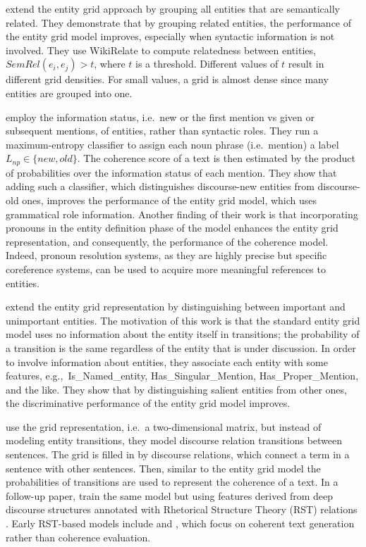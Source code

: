  extend the entity grid approach by grouping all entities that are semantically related.  
They demonstrate that by grouping related entities, the performance of the entity grid model improves, especially when syntactic information is not involved. 
They use WikiRelate \cite{strube.aaai06} to compute relatedness between entities, $SemRel(e_i,e_j) >t$, where $t$ is a threshold.
Different values of $t$ result in different grid densities. 
For small values, a grid is almost dense since many entities are grouped into one.  

 employ the information status, i.e.\ new or the first mention vs given or subsequent mentions, of entities, rather than syntactic roles. 
They run a maximum-entropy classifier to assign each noun phrase (i.e.\ mention) a label $L_{np} \in \lbrace new, old \rbrace$. 
The coherence score of a text is then estimated by the product of probabilities over the information status of each mention. 
They show that adding such a classifier, which distinguishes discourse-new entities from discourse-old ones, improves the performance of the entity grid model, which uses grammatical role information.  
Another finding of their work is that incorporating pronouns in the entity definition phase of the model enhances the entity grid representation, and consequently, the performance of the coherence model. 
Indeed, pronoun resolution systems, as they are highly precise but specific coreference systems, can be used to acquire more meaningful references to entities. 

 extend the entity grid representation by distinguishing between important and unimportant entities. 
The motivation of this work is that the standard entity grid model uses no information about the entity itself in transitions; the probability of a transition is the same regardless of the entity that is under discussion. 
In order to involve information about entities, they associate each entity with some features, e.g.,\ Is\_Named\_entity, Has\_Singular\_Mention, Has\_Proper\_Mention, and the like. 
They show that by distinguishing salient entities from other ones, the discriminative performance of the entity grid model improves. 

 use the grid representation, i.e.\ a two-dimensional matrix, but instead of modeling entity transitions, they model discourse relation transitions between sentences. 
The grid is filled in by discourse relations, which connect a term in a sentence with other sentences. 
Then, similar to the entity grid model the probabilities of transitions are used to represent the coherence of a text. 
In a follow-up paper,  train the same model but using features derived from deep discourse structures annotated with Rhetorical Structure Theory (RST) relations \cite{mann88,prasad08a}. 
Early RST-based models include  and , which focus on coherent text generation rather than coherence evaluation. 

